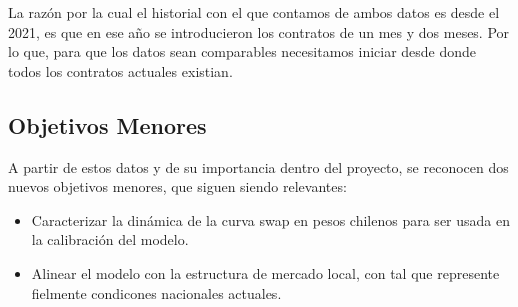 \qquad La razón por la cual el historial con el que contamos de ambos datos es desde el 2021, es que en ese año se introducieron los contratos de un mes y dos meses. Por lo que, para que los datos sean comparables necesitamos iniciar desde donde todos los contratos actuales existian.

\subsection{Objetivos Menores}

\qquad A partir de estos datos y de su importancia dentro del proyecto, se reconocen dos nuevos objetivos menores, que siguen siendo relevantes:

\begin{itemize}
    \item Caracterizar la dinámica de la curva swap en pesos chilenos para ser usada en la calibración del modelo.
    \item Alinear el modelo con la estructura de mercado local, con tal que represente fielmente condicones nacionales actuales.
\end{itemize}